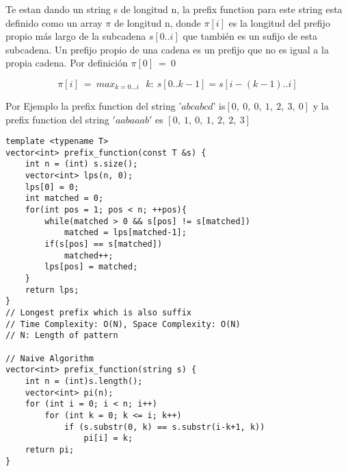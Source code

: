 \documentclass[10pt,letterpaper,twocolumn,twosided]{article}
\begin{document}
Te estan dando un string s de longitud n, la prefix function para este string esta definido como un array $\pi$ de longitud n, donde $\pi[i]$ es la longitud del prefijo propio más largo de la subcadena $s[0..i]$ que también es un sufijo de esta subcadena. Un prefijo propio de una cadena es un prefijo que no es igual a la propia cadena. Por definición $\pi[0]\:=\:0$

$$\pi \left[i\right]\:=\:max_{k=0...i}\:\:\:k:\:s\left[0..k-1\right]=s\left[i-\left(k-1\right)..i\right]$$

\newline

Por Ejemplo la prefix function del string '$abcabcd$' is$ \left[0,\:0,\:0,\:1,\:2,\:3,\:0\right]$ y la prefix function del string $'aabaaab'$ es $\left[0,\:1,\:0,\:1,\:2,\:2,\:3\right]$

\begin{lstlisting}
template <typename T>
vector<int> prefix_function(const T &s) {
    int n = (int) s.size();
    vector<int> lps(n, 0);
    lps[0] = 0;
    int matched = 0;
    for(int pos = 1; pos < n; ++pos){
        while(matched > 0 && s[pos] != s[matched])
            matched = lps[matched-1];
        if(s[pos] == s[matched])
            matched++;
        lps[pos] = matched;
    }
    return lps;
}
// Longest prefix which is also suffix
// Time Complexity: O(N), Space Complexity: O(N)
// N: Length of pattern

// Naive Algorithm
vector<int> prefix_function(string s) {
    int n = (int)s.length();
    vector<int> pi(n);
    for (int i = 0; i < n; i++)
        for (int k = 0; k <= i; k++)
            if (s.substr(0, k) == s.substr(i-k+1, k))
                pi[i] = k;
    return pi;
}
\end{lstlisting}
\end{document}
